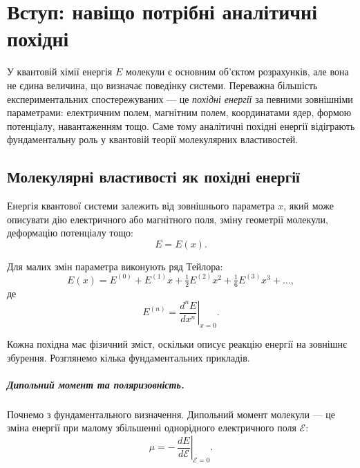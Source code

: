 \documentclass{PySCFBook}
\begin{document}
\chapter{Вступ: навіщо потрібні аналітичні похідні}

У квантовій хімії енергія $E$ молекули є основним об'єктом розрахунків, але
вона не єдина величина, що визначає поведінку системи.
Переважна більшість експериментальних спостережуваних --- це \emph{похідні
	енергії} за певними зовнішніми параметрами:
електричним полем, магнітним полем, координатами ядер, формою потенціалу,
навантаженням тощо.
Саме тому аналітичні похідні енергії відіграють фундаментальну роль
у квантовій теорії молекулярних властивостей.

\section{Молекулярні властивості як похідні енергії}

Енергія квантової системи залежить від зовнішнього параметра $x$,
який може описувати дію електричного або магнітного поля,
зміну геометрії молекули, деформацію потенціалу тощо:
\begin{equation}
	E = E(x).
	\label{eq:E_x_def}
\end{equation}

Для малих змін параметра виконують ряд Тейлора:
\begin{equation}
	E(x)=
	E^{(0)} + E^{(1)}x + \tfrac12 E^{(2)}x^2 + \tfrac16 E^{(3)}x^3 + \dots,
	\label{eq:E_Taylor}
\end{equation}
де
\begin{equation}
	E^{(n)} =
	\left.\frac{d^n E}{dx^n}\right|_{x=0}.
	\label{eq:E_n_def}
\end{equation}

Кожна похідна має фізичний зміст, оскільки описує реакцію енергії на зовнішнє збурення. Розглянемо кілька фундаментальних прикладів.

\paragraph{Дипольний момент та поляризовність.}

Почнемо з фундаментального визначення.
Дипольний момент молекули --- це зміна енергії при малому збільшенні
однорідного електричного поля $\mathcal{E}$:
\begin{equation}
	\mu = -\,\left.\frac{dE}{d\mathcal{E}}\right|_{\mathcal{E}=0}.
	\label{eq:dipole_def}
\end{equation}
\end{document}

